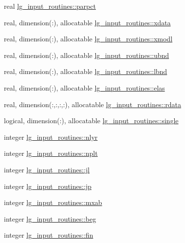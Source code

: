 \begin{DoxyCompactItemize}
\item 
real \hyperlink{namespacelg__input__routines_a17fa14f47c0c3b7209482e10238fa8b8}{lg\+\_\+input\+\_\+routines\+::parpct}
\item 
real, dimension(\+:), allocatable \hyperlink{namespacelg__input__routines_af1d98dc71b47044d85f3f75345bd4ad5}{lg\+\_\+input\+\_\+routines\+::xdata}
\item 
real, dimension(\+:), allocatable \hyperlink{namespacelg__input__routines_ae31b5c3866f71b018a3e0dc5d4c63e6c}{lg\+\_\+input\+\_\+routines\+::xmodl}
\item 
real, dimension(\+:), allocatable \hyperlink{namespacelg__input__routines_a53f662035d1167d4af1fc7834120a430}{lg\+\_\+input\+\_\+routines\+::ubnd}
\item 
real, dimension(\+:), allocatable \hyperlink{namespacelg__input__routines_ae4125e25f60f0e4a3f3a59c66c9896ac}{lg\+\_\+input\+\_\+routines\+::lbnd}
\item 
real, dimension(\+:), allocatable \hyperlink{namespacelg__input__routines_a45d7d9feedc943e6eeb7c96241a56cb9}{lg\+\_\+input\+\_\+routines\+::elas}
\item 
real, dimension(\+:,\+:,\+:,\+:), allocatable \hyperlink{namespacelg__input__routines_a6f87e762092d8ff698807f2ad59f2af3}{lg\+\_\+input\+\_\+routines\+::rdata}
\item 
logical, dimension(\+:), allocatable \hyperlink{namespacelg__input__routines_a09029b4bdcd2d8c5ae75d95f22599c0f}{lg\+\_\+input\+\_\+routines\+::single}
\item 
integer \hyperlink{namespacelg__input__routines_a6db35964e1d4e1d73b76f93d728b96e9}{lg\+\_\+input\+\_\+routines\+::nlyr}
\item 
integer \hyperlink{namespacelg__input__routines_ac4f7a7edd592899c2e3180d01abdb6ec}{lg\+\_\+input\+\_\+routines\+::nplt}
\item 
integer \hyperlink{namespacelg__input__routines_a43617bbf513a31819fdd9102f2d14960}{lg\+\_\+input\+\_\+routines\+::jl}
\item 
integer \hyperlink{namespacelg__input__routines_afca0d53e4281898737d338026b40e53d}{lg\+\_\+input\+\_\+routines\+::jp}
\item 
integer \hyperlink{namespacelg__input__routines_a7a11100cb9dbcf30ddd8ea9802e951c7}{lg\+\_\+input\+\_\+routines\+::mxab}
\item 
integer \hyperlink{namespacelg__input__routines_ad240d679ecd403cc52aac764201bfc5b}{lg\+\_\+input\+\_\+routines\+::beg}
\item 
integer \hyperlink{namespacelg__input__routines_a67371f9c06d68b95d45184555688f5da}{lg\+\_\+input\+\_\+routines\+::fin}

\end{DoxyCompactItemize}
